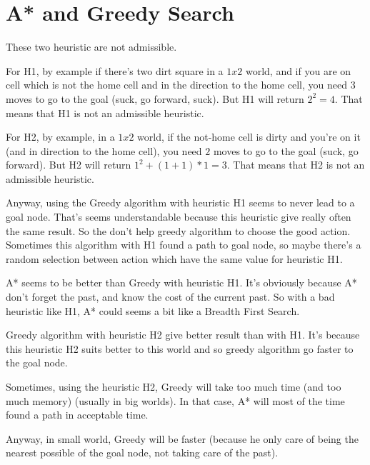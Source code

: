 \section{A* and Greedy Search}
These two heuristic are not admissible.

For H1, by example if there's two dirt square in a $1x2$ world, and if you are on cell which is not the home cell and in the direction to the home cell, you need 3 moves to go to the goal (suck, go forward, suck). But H1 will return $2^2 = 4$. That means that H1 is not an admissible heuristic.

For H2, by example, in a $1x2$ world, if the not-home cell is dirty and you're on it (and in direction to the home cell), you need $2$ moves to go to the goal (suck, go forward). But H2 will return $1^2 + (1+1)*1 = 3$. That means that H2 is not an admissible heuristic.

Anyway, using the Greedy algorithm with heuristic H1 seems to never lead to a goal node. That's seems understandable because this heuristic give really often the same result. So the don't help greedy algorithm to choose the good action. Sometimes this algorithm with H1 found a path to goal node, so maybe there's a random selection between action which have the same value for heuristic H1.

A* seems to be better than Greedy with heuristic H1. It's obviously because A* don't forget the past, and know the cost of the current past. So with a bad heuristic like H1, A* could seems a bit like a Breadth First Search.

Greedy algorithm with heuristic H2 give better result than with H1. It's because this heuristic H2 suits better to this world and so greedy algorithm go faster to the goal node. 

Sometimes, using the heuristic H2, Greedy will take too much time (and too much memory) (usually in big worlds). In that case, A* will most of the time found a path in acceptable time.

Anyway, in small world, Greedy will be faster (because he only care of being the nearest possible of the goal node, not taking care of the past).

